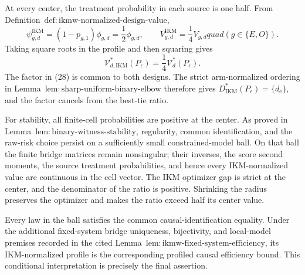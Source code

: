 At every center, the treatment probability in each source is one half.  From Definition~\(\mathrm{def{:}ikmw\text{-}normalized\text{-}design\text{-}value}\),
\[
 \psi_{g,d}^{\mathrm{IKM}}=(1-p_{g,1})\phi_{g,d}=\frac12\phi_{g,d},
 \qquad
 V_{g,d}^{\mathrm{IKM}}=\frac14V_{g,d}quad(g\in\{E,O\}). \tag{27}
\]
Taking square roots in the profile and then squaring gives
\[
 \mathcal V_{d,\mathrm{IKM}}^*(P_\epsilon)
 =\frac14\mathcal V_d^*(P_\epsilon).                      \tag{28}
\]
The factor in (28) is common to both designs.  The strict arm-normalized ordering in Lemma~\(\mathrm{lem{:}sharp\text{-}uniform\text{-}binary\text{-}elbow}\) therefore gives \(D_{\mathrm{IKM}}^*(P_\epsilon)=\{d_{\mathrm e}\}\), and the factor cancels from the best-tie ratio.

For stability, all finite-cell probabilities are positive at the center.  As proved in Lemma~\(\mathrm{lem{:}binary\text{-}witness\text{-}stability}\), regularity, common identification, and the raw-risk choice persist on a sufficiently small constrained-model ball.  On that ball the finite bridge matrices remain nonsingular; their inverses, the score second moments, the source treatment probabilities, and hence every IKM-normalized value are continuous in the cell vector.  The IKM optimizer gap is strict at the center, and the denominator of the ratio is positive.  Shrinking the radius preserves the optimizer and makes the ratio exceed half its center value.

Every law in the ball satisfies the common causal-identification equality.  Under the additional fixed-system bridge uniqueness, bijectivity, and local-model premises recorded in the cited Lemma~\(\mathrm{lem{:}ikmw\text{-}fixed\text{-}system\text{-}efficiency}\), its IKM-normalized profile is the corresponding profiled causal efficiency bound.  This conditional interpretation is precisely the final assertion.